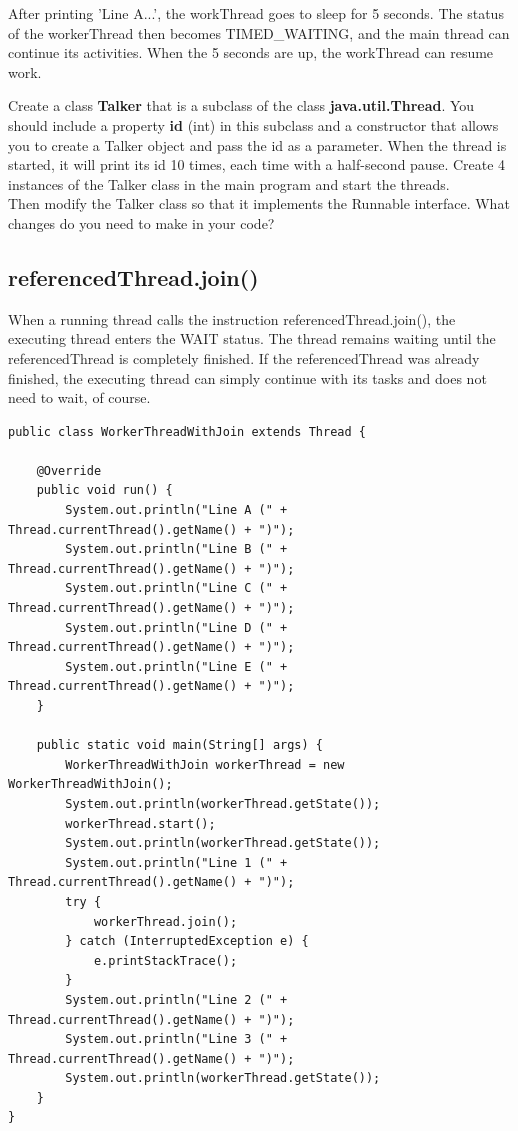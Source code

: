 After printing 'Line A...', the workThread goes to sleep for 5 seconds. The status of the workerThread then becomes TIMED\_WAITING, and the main thread can continue its activities. When the 5 seconds are up, the workThread can resume work.

\begin{oefening}
Create a class \textbf{Talker} that is a subclass of the class \textbf{java.util.Thread}.
You should include a property \textbf{id} (int) in this subclass and a constructor that allows you to create a Talker object and pass the id as a parameter.
When the thread is started, it will print its id 10 times, each time with a half-second pause.
Create 4 instances of the Talker class in the main program and start the threads.
\\
Then modify the Talker class so that it implements the Runnable interface. What changes do you need to make in your code?
\end{oefening}

\subsection{referencedThread.join()}

When a running thread calls the instruction referencedThread.join(), the executing thread enters the WAIT status. The thread remains waiting until the referencedThread is completely finished. If the referencedThread was already finished, the executing thread can simply continue with its tasks and does not need to wait, of course.


\begin{lstlisting}
public class WorkerThreadWithJoin extends Thread {

	@Override
	public void run() {
		System.out.println("Line A (" + Thread.currentThread().getName() + ")");
		System.out.println("Line B (" + Thread.currentThread().getName() + ")");
		System.out.println("Line C (" + Thread.currentThread().getName() + ")");
		System.out.println("Line D (" + Thread.currentThread().getName() + ")");
		System.out.println("Line E (" + Thread.currentThread().getName() + ")");
	}

	public static void main(String[] args) {
		WorkerThreadWithJoin workerThread = new WorkerThreadWithJoin();
		System.out.println(workerThread.getState());
		workerThread.start();
		System.out.println(workerThread.getState());
		System.out.println("Line 1 (" + Thread.currentThread().getName() + ")");
		try {
			workerThread.join();
		} catch (InterruptedException e) {
			e.printStackTrace();
		}
		System.out.println("Line 2 (" + Thread.currentThread().getName() + ")");
		System.out.println("Line 3 (" + Thread.currentThread().getName() + ")");
		System.out.println(workerThread.getState());
	}
}
\end{lstlisting}

